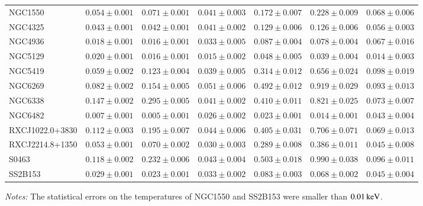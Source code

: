 \documentclass[structabstract]{aa}
\begin{document}
\begin{table}
\begin{threeparttable}
\begin{tabularx}{\textwidth}{lYYYYYY}
NGC1550 & $0.054\pm0.001$ & $0.071\pm0.001$ & $0.041\pm0.003$ & $0.172\pm0.007$ & $0.228\pm0.009$ & $0.068\pm0.006$ \\ 
NGC4325 & $0.043\pm0.001$ & $0.042\pm0.001$ & $0.041\pm0.002$ & $0.129\pm0.006$ & $0.126\pm0.006$ & $0.056\pm0.003$ \\ 
NGC4936 & $0.018\pm0.001$ & $0.016\pm0.001$ & $0.033\pm0.005$ & $0.087\pm0.004$ & $0.078\pm0.004$ & $0.067\pm0.016$ \\ 
NGC5129 & $0.020\pm0.001$ & $0.016\pm0.001$ & $0.015\pm0.002$ & $0.048\pm0.005$ & $0.039\pm0.004$ & $0.014\pm0.003$ \\ 
NGC5419 & $0.059\pm0.002$ & $0.123\pm0.004$ & $0.039\pm0.005$ & $0.314\pm0.012$ & $0.656\pm0.024$ & $0.098\pm0.019$ \\ 
NGC6269 & $0.082\pm0.002$ & $0.154\pm0.005$ & $0.051\pm0.006$ & $0.492\pm0.012$ & $0.919\pm0.029$ & $0.093\pm0.013$ \\ 
NGC6338 & $0.147\pm0.002$ & $0.295\pm0.005$ & $0.041\pm0.002$ & $0.410\pm0.011$ & $0.821\pm0.025$ & $0.073\pm0.007$ \\ 
NGC6482 & $0.007\pm0.001$ & $0.005\pm0.001$ & $0.026\pm0.002$ & $0.023\pm0.001$ & $0.014\pm0.001$ & $0.043\pm0.004$ \\ 
RXCJ1022.0+3830 & $0.112\pm0.003$ & $0.195\pm0.007$ & $0.044\pm0.006$ & $0.405\pm0.031$ & $0.706\pm0.071$ & $0.069\pm0.013$ \\ 
RXCJ2214.8+1350 & $0.053\pm0.001$ & $0.070\pm0.002$ & $0.030\pm0.003$ & $0.289\pm0.008$ & $0.386\pm0.011$ & $0.045\pm0.008$ \\ 
S0463 & $0.118\pm0.002$ & $0.232\pm0.006$ & $0.043\pm0.004$ & $0.503\pm0.018$ & $0.990\pm0.038$ & $0.096\pm0.011$ \\ 
SS2B153 & $0.029\pm0.001$ & $0.023\pm0.001$ & $0.033\pm0.002$ & $0.083\pm0.003$ & $0.068\pm0.002$ & $0.045\pm0.004$ \\ \hline
\end{tabularx}
\label{tab:derived}
 \begin{tablenotes}
\item[] \emph{Notes:} The statistical errors on the temperatures of NGC1550 and SS2B153 were smaller than $\unit[0.01]{keV}$.
\end{tablenotes}
\end{threeparttable}
\end{table}
%
\end{document}
